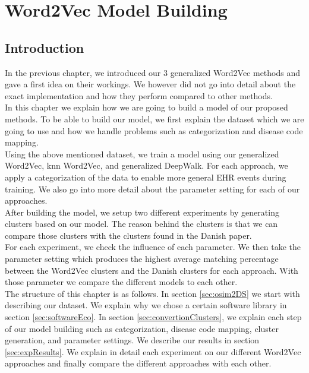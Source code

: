 \graphicspath{ {Implementation/Images/} }


\chapter{Word2Vec Model Building}
\label{cha:implementation}

\section{Introduction}

In the previous chapter, we introduced our $3$ generalized Word2Vec methods and gave a first idea on their workings. We however did not go into detail about the exact implementation and how they perform compared to other methods.  \\

In this chapter we explain how we are going to build a model of our proposed methods. To be able to build our model, we first explain the dataset which we are going to use and how we handle problems such as categorization and disease code mapping. \\
Using the above mentioned dataset, we train a model using our generalized Word2Vec, knn Word2Vec, and generalized DeepWalk. For each approach, we apply a categorization of the data to enable more general EHR events during training. We also go into more detail about the parameter setting for each of our approaches. \\

After building the model, we setup two different experiments by generating clusters based on our model. The reason behind the clusters is that we can compare those clusters with the clusters found in the Danish paper. \\
For each experiment, we check the influence of each parameter. We then take the parameter setting which produces the highest average matching percentage between the Word2Vec clusters and the Danish clusters for each approach. With those parameter we compare the different models to each other. \\

The structure of this chapter is as follows. In section \ref{sec:osim2DS} we start with describing our dataset. We explain why we chose a certain software library in section \ref{sec:softwareEco}. In section \ref{sec:convertionClusters}, we explain each step of our model building such as categorization, disease code mapping, cluster generation, and parameter settings. We describe our results in section \ref{sec:expResults}. We explain in detail each experiment on our different Word2Vec approaches and finally compare the different approaches with each other.


